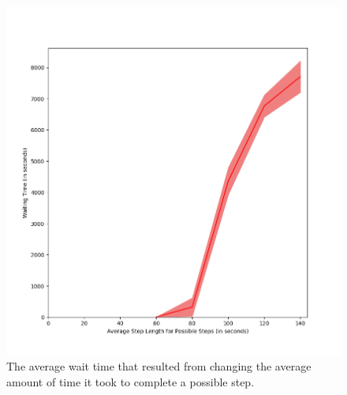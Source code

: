 \begin{figure}[H]
  \includegraphics[width=\textwidth]{figures/montecarlo/vary_step_length.png}
  \caption{
    The average wait time that resulted from changing the average amount of time
    it took to complete a possible step.
  }\label{fig:vary_step_length}
\end{figure}
